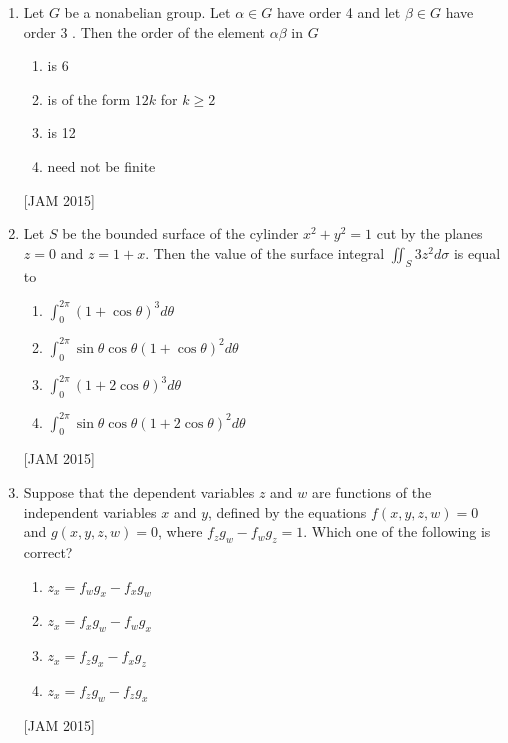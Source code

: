 \begin{enumerate}
\begin{enumerate}
\item $2 x^{2}+3 y^{2}=C_{2}$ 
\item $3 x^{2}+2 y^{2}=C_{2}$ 
\item $3 x^{2}+y^{2}=C_{2}$ 
\item $x^{2}+3 y^{2}=c_{2}$

\end{enumerate}
\hfill [JAM 2015]



\item  Let $G$ be a nonabelian group. Let $\alpha \in G$ have order 4 and let $\beta \in G$ have order 3 . Then the order of the element $\alpha \beta$ in $G$ 
\begin{enumerate}
    
\item is 6 
\item is of the form $12 k$ for $k \geq 2$ 
\item is 12 
\item need not be finite

\end{enumerate}
\hfill [JAM 2015]



\item  Let $S$ be the bounded surface of the cylinder $x^{2}+y^{2}=1$ cut by the planes $z=0$ and $z=1+x$. Then the value of the surface integral $\iint_{S} 3 z^{2} d \sigma$ is equal to 
\begin{enumerate}
    \item $\int_{0}^{2 \pi}(1+\cos \theta)^{3} d \theta$ 
\item $\int_{0}^{2 \pi} \sin \theta \cos \theta(1+\cos \theta)^{2} d \theta$ 
\item $\int_{0}^{2 \pi}(1+2 \cos \theta)^{3} d \theta$ 
\item $\int_{0}^{2 \pi} \sin \theta \cos \theta(1+2 \cos \theta)^{2} d \theta$
\end{enumerate}
\hfill [JAM 2015]





\item  Suppose that the dependent variables $z$ and $w$ are functions of the independent variables $x$ and $y$, defined by the equations $f(x, y, z, w)=0$ and $g(x, y, z, w)=0$, where $f_{z} g_{w}-f_{w} g_{z}=1$. Which one of the following is correct? 
\begin{enumerate}
    
\item $z_{x}=f_{w} g_{x}-f_{x} g_{w}$ 
\item $z_{x}=f_{x} g_{w}-f_{w} g_{x}$ 
\item $z_{x}=f_{z} g_{x}-f_{x} g_{z}$ 
\item $z_{x}=f_{z} g_{w}-f_{z} g_{x}$
\end{enumerate}
\hfill [JAM 2015]





\end{enumerate}
